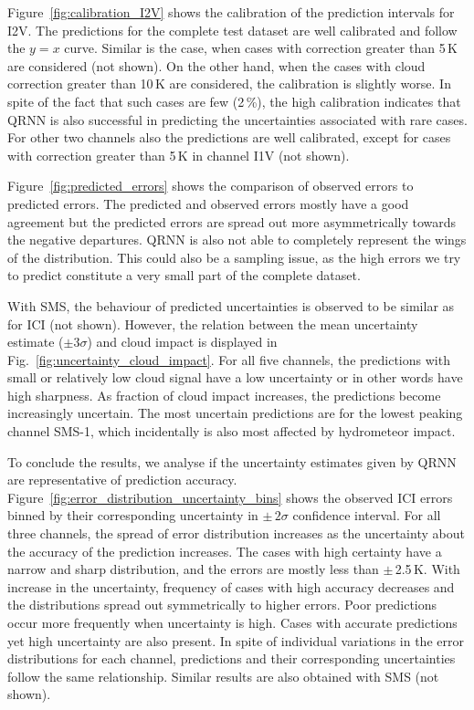 \documentclass[amt, manuscript]{copernicus}
\begin{document}
Figure~\ref{fig:calibration_I2V} shows the calibration of the prediction intervals for I2V. The predictions for the complete test dataset are well calibrated and follow the $y =x$ curve. Similar is the case, when cases with correction greater than 5\,K are considered (not shown). On the other hand, when  the cases with cloud correction greater than 10\,K are considered, the calibration is  slightly worse. In spite of the fact that such cases are few (2\,\%), the high calibration indicates that QRNN is also successful in predicting the uncertainties associated with rare cases. For other two channels also the predictions are well calibrated, except for cases with correction greater than 5\,K in channel I1V (not shown). 

Figure~\ref{fig:predicted_errors} shows the comparison of observed errors to predicted errors. The predicted and observed errors mostly have a good agreement but the predicted errors are spread out more asymmetrically towards the negative departures. QRNN is also not able to completely represent the wings of the distribution. This could also be a sampling issue, as the high errors we try to predict constitute a very small part of the complete dataset. 

With SMS, the behaviour of predicted uncertainties is observed to be similar as for ICI (not shown). However, the relation between the mean uncertainty estimate ($\pm3\sigma$) and cloud impact is displayed in Fig.~\ref{fig:uncertainty_cloud_impact}. For all five channels, the predictions with small or relatively low cloud signal have a low uncertainty or in other words have high sharpness. As fraction of cloud impact increases, the predictions become increasingly uncertain. The most uncertain predictions are for the lowest peaking channel SMS-1, which incidentally is also most affected by  hydrometeor impact.  

To conclude the results, we analyse if the uncertainty estimates given by QRNN are representative of prediction accuracy. Figure~\ref{fig:error_distribution_uncertainty_bins} shows the observed ICI errors binned by their corresponding uncertainty in $\pm\,2\sigma$  confidence interval. For all three channels, the spread of error distribution increases as the uncertainty about the accuracy of the prediction increases. The cases with high certainty have a narrow and sharp distribution, and the errors are mostly less than $\pm\,$2.5\,K. With increase in the uncertainty, frequency of cases with high accuracy decreases and the distributions spread out symmetrically to higher errors. Poor predictions occur more frequently when uncertainty is high. Cases with accurate predictions yet high uncertainty are also present. In spite of individual variations in the error distributions for each channel, predictions and their corresponding uncertainties follow the same relationship. Similar results are also obtained with SMS (not shown). 
\end{document}
